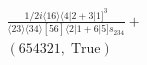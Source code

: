\documentclass[varwidth, border=5pt]{standalone}
\begin{document}
\begin{my}
$\begin{gathered}
\scriptscriptstyle\frac{1/2i⟨16⟩⟨4|2+3|1]^3}{⟨23⟩⟨34⟩[56]⟨2|1+6|5]s_{234}}+\\
\scriptscriptstyle(654321,\;\text{True})\phantom{+}
\end{gathered}$
\end{my}
\end{document}
